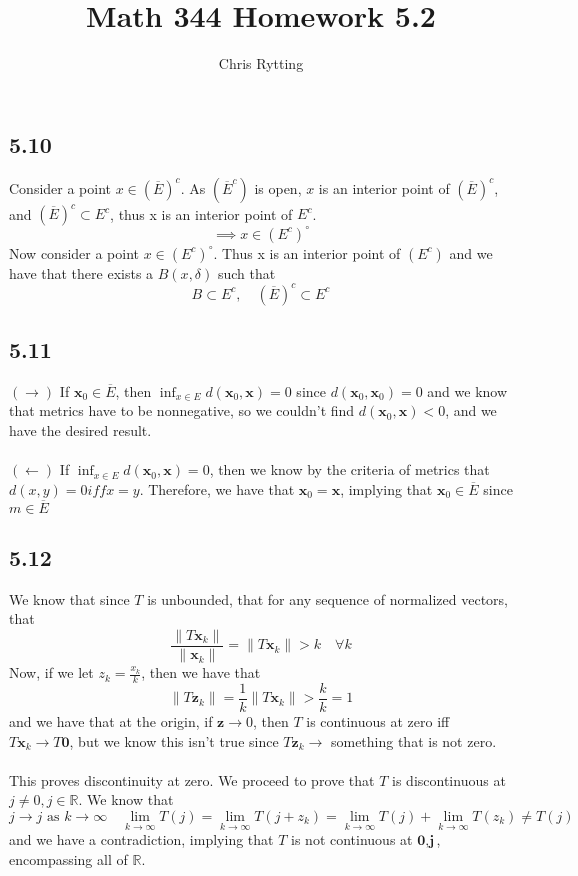 \documentclass[letterpaper,12pt]{article}
\theoremstyle{definition}
\begin{document}
\title{Math 344 Homework 5.2}
\author{Chris Rytting}
\maketitle

\subsection*{5.10}
Consider a point $x \in (\overline E )^c$. As $(\overline E^c) $ is open, $x$ is an interior point of $(\overline E)^c$, and $(\overline E) ^c \subset E^c$, thus x is an interior point of $E^c$.
\[\implies x \in (E^c)^\circ\]
Now consider a point $x \in (E^c)^\circ$. Thus x is an interior point of $(E^c)$ and we have that there exists a $B(x, \delta)$ such that \[B \subset E^c, \quad (\overline E)^c \subset E^c\]

\subsection*{5.11}
$(\rightarrow)$ If $ \textbf{x}_0 \in \overline E $, then $\inf_{x\in E} d( \textbf{x}_0, \textbf{x}) = 0  $ since $d( \textbf{x}_0, \textbf{x}_0) = 0$ and we know that metrics have to be nonnegative, so we couldn't find $d( \textbf{x}_0, \textbf{x}) < 0$, and we have the desired result.\\\\
$(\leftarrow)$ If $\inf_{x\in E} d( \textbf{x}_0, \textbf{x}) = 0  $, then we know by the criteria of metrics that $d(x,y) = 0 iff x = y$. Therefore, we have that $ \textbf{x}_0 = \textbf{x}  $, implying that $ \textbf{x}_0 \in \overline E $ since $m \in \overline E$

\subsection*{5.12}
We know that since $T$ is unbounded, that for any sequence of normalized vectors, that
\[\frac{\|T \textbf{x}_k \| }{\| \textbf{x}_k \| } = \|T \textbf{x}_k \| > k \quad \forall k  \]
Now, if we let $z_k = \frac{x_k}{k}$, then we have that
\[ \| T \textbf{z} _k \| = \frac{1}{k} \|T \textbf{x}_k \| > \frac{k}{k} = 1\]
and we have that at the origin, if $ \textbf{z} \to 0 $, then $T$ is continuous at zero iff $T \textbf{x}_k \to T \textbf{0}  $, but we know this isn't true since $T \textbf{z}_k \to$ something that is not zero.\\\\
This proves discontinuity at zero. We proceed to prove that $T$ is discontinuous at $j \neq 0, j \in \mathbb{R}$. We know that 
\[j \to j \text{ as } k \to \infty \quad \lim_{k \to \infty} T(j) = \lim_{k \to \infty} T(j + z_k) = \lim_{k \to \infty} T(j) + \lim_{k \to \infty} T(z_k) \neq T(j)\]
and we have a contradiction, implying that $T$ is not continuous at $ \textbf{0}, \textbf{j}  $, encompassing all of $\mathbb{R}$.
\end{document}
